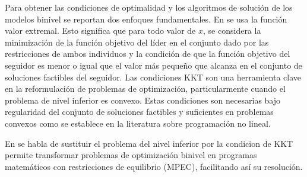 Para obtener las condiciones de optimalidad y los algoritmos de solución de los modelos binivel se reportan dos enfoques fundamentales. En \cite{DempeyZemkoho2020} se usa la función valor extremal. 
Esto significa que para todo valor de $x$, se considera la minimización de la función objetivo del líder en el conjunto dado por las restricciones de ambos individuos y la condición de que la función objetivo del seguidor es menor o igual que el valor más pequeño que alcanza en el conjunto de soluciones factibles del seguidor.
Las condiciones KKT son una herramienta clave en la reformulación de problemas de optimización, particularmente cuando el problema de nivel inferior es convexo. 
Estas condiciones son necesarias bajo regularidad del conjunto de soluciones factibles  y suficientes en problemas convexos 
como se establece en la literatura sobre programación no lineal.
 
En \cite{Caselli2024BilevelOW,DempeyZemkoho2020,phdthesisCerulli} se habla de  sustituir el problema del nivel inferior por la condicion de KKT permite transformar problemas de optimización binivel en programas matemáticos con restricciones de equilibrio (MPEC), facilitando así su resolución.


